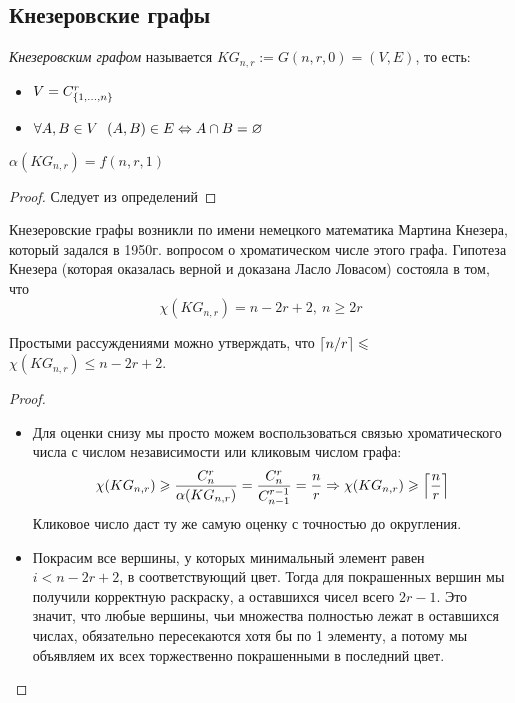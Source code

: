 \subsection{Кнезеровские графы}

\begin{definition}
	\textit{Кнезеровским графом} называется $KG_{n, r} := G(n, r, 0) = (V, E)$, то есть:
	\begin{itemize}
		\item $V = C_{\{1, \ldots, n\}}^r$
		
		\item $\forall A, B \in V\ \ (A, B) \in E \Leftrightarrow A \cap B = \varnothing$
	\end{itemize}
\end{definition}

\begin{proposition}
	$\alpha(KG_{n, r}) = f(n, r, 1)$
\end{proposition}

\begin{proof}
	Следует из определений
\end{proof}

\begin{note}
	Кнезеровские графы возникли по имени немецкого математика Мартина Кнезера, который задался в 1950г. вопросом о хроматическом числе этого графа. Гипотеза Кнезера (которая оказалась верной и доказана Ласло Ловасом) состояла в том, что
	\[
		\chi(KG_{n, r}) = n - 2r + 2,\ n \ge 2r
	\]
\end{note}

\begin{proposition}
	Простыми рассуждениями можно утверждать, что $\left\lceil n / r \right\rceil \leqslant$ \\ $\chi(KG_{n, r}) \le n - 2r + 2$.
\end{proposition}

\begin{proof}~
	\begin{itemize}
		\item Для оценки снизу мы просто можем воспользоваться связью хроматического числа с числом независимости или кликовым числом графа:
		\[
			\chi(KG_{n, r}) \geqslant \frac{C_n^r}{\alpha(KG_{n, r})} = \frac{C_n^r}{C_{n - 1}^{r - 1}} = \frac{n}{r} \Rightarrow \chi(KG_{n, r}) \geqslant \left\lceil \frac{n}{r} \right\rceil
		\]
		Кликовое число даст ту же самую оценку с точностью до округления.
		
		\item Покрасим все вершины, у которых минимальный элемент равен $i < n - 2r + 2$, в соответствующий цвет. Тогда для покрашенных вершин мы получили корректную раскраску, а оставшихся чисел всего $2r - 1$. Это значит, что любые вершины, чьи множества полностью лежат в оставшихся числах, обязательно пересекаются хотя бы по 1 элементу, а потому мы объявляем их всех торжественно покрашенными в последний цвет.
	\end{itemize}
\end{proof}

